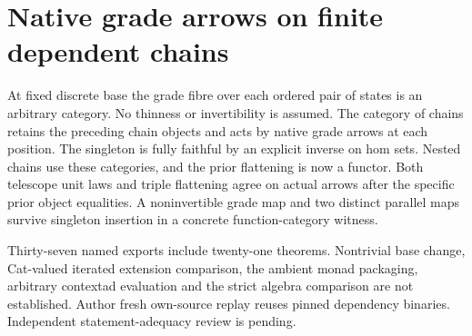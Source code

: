 \documentclass{article}
\begin{document}
\section*{Native grade arrows on finite dependent chains}
At fixed discrete base the grade fibre over each ordered pair of states is an arbitrary category. No thinness or invertibility is assumed. The category of chains retains the preceding chain objects and acts by native grade arrows at each position. The singleton is fully faithful by an explicit inverse on hom sets. Nested chains use these categories, and the prior flattening is now a functor. Both telescope unit laws and triple flattening agree on actual arrows after the specific prior object equalities. A noninvertible grade map and two distinct parallel maps survive singleton insertion in a concrete function-category witness.

Thirty-seven named exports include twenty-one theorems. Nontrivial base change, Cat-valued iterated extension comparison, the ambient monad packaging, arbitrary contextad evaluation and the strict algebra comparison are not established. Author fresh own-source replay reuses pinned dependency binaries. Independent statement-adequacy review is pending.
\end{document}
